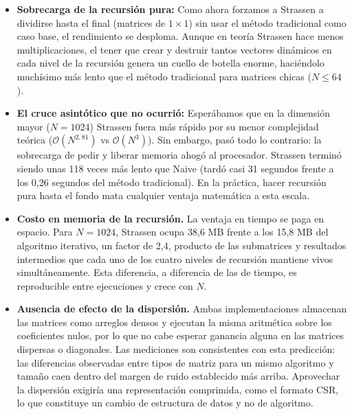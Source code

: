 \begin{itemize}
    \item \textbf{Sobrecarga de la recursión pura:} Como ahora forzamos a Strassen a dividirse hasta el final (matrices de $1 \times 1$) sin usar el método tradicional como caso base, el rendimiento se desploma. Aunque en teoría Strassen hace menos multiplicaciones, el tener que crear y destruir tantos vectores dinámicos en cada nivel de la recursión genera un cuello de botella enorme, haciéndolo muchísimo más lento que el método tradicional para matrices chicas ($N \le 64$).

    \item \textbf{El cruce asintótico que no ocurrió:} Esperábamos que en la dimensión mayor ($N = 1024$) Strassen fuera más rápido por su menor complejidad teórica ($\mathcal{O}(N^{2,81})$ vs $\mathcal{O}(N^3)$). Sin embargo, pasó todo lo contrario: la sobrecarga de pedir y liberar memoria ahogó al procesador. Strassen terminó siendo unas 118 veces más lento que Naive (tardó casi 31 segundos frente a los 0,26 segundos del método tradicional). En la práctica, hacer recursión pura hasta el fondo mata cualquier ventaja matemática a esta escala.

    \item \textbf{Costo en memoria de la recursión.} La ventaja en tiempo se paga en espacio. Para $N = 1024$, Strassen ocupa 38{,}6 MB frente a los 15{,}8 MB del algoritmo iterativo, un factor de 2{,}4, producto de las submatrices y resultados intermedios que cada uno de los cuatro niveles de recursión mantiene vivos simultáneamente. Esta diferencia, a diferencia de las de tiempo, es reproducible entre ejecuciones y crece con $N$.

    \item \textbf{Ausencia de efecto de la dispersión.} Ambas implementaciones almacenan las matrices como arreglos densos y ejecutan la misma aritmética sobre los coeficientes nulos, por lo que no cabe esperar ganancia alguna en las matrices dispersas o diagonales. Las mediciones son consistentes con esta predicción: las diferencias observadas entre tipos de matriz para un mismo algoritmo y tamaño caen dentro del margen de ruido establecido más arriba. Aprovechar la dispersión exigiría una representación comprimida, como el formato CSR, lo que constituye un cambio de estructura de datos y no de algoritmo.
\end{itemize}
